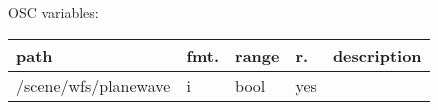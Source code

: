\begin{snugshade}
{\footnotesize
\label{osctab:receivermodwfs}
OSC variables:
\nopagebreak

\begin{tabularx}{\textwidth}{llllX}
\hline
path & fmt. & range & r. & description\\
\hline
/scene/wfs/planewave & i & bool & yes & \\
\hline
\end{tabularx}
}
\end{snugshade}
